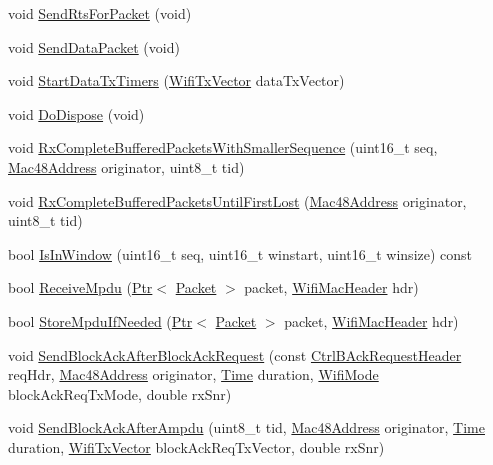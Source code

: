\begin{DoxyCompactItemize}
\item 
void \hyperlink{classns3_1_1MacLow_ac472702b866a51ea2dfb7637381897aa}{Send\+Rts\+For\+Packet} (void)
\item 
void \hyperlink{classns3_1_1MacLow_ab177d7c7ba53c56f91612114412914bf}{Send\+Data\+Packet} (void)
\item 
void \hyperlink{classns3_1_1MacLow_ae7e8072b7d1f8b775000f6f07ee5a3c1}{Start\+Data\+Tx\+Timers} (\hyperlink{classns3_1_1WifiTxVector}{Wifi\+Tx\+Vector} data\+Tx\+Vector)
\item 
void \hyperlink{classns3_1_1MacLow_a5b5f194e54b33b969b9cf8a05728d9fe}{Do\+Dispose} (void)
\item 
void \hyperlink{classns3_1_1MacLow_aaed81a6cbf94baf2b2f17b9f96b8474d}{Rx\+Complete\+Buffered\+Packets\+With\+Smaller\+Sequence} (uint16\+\_\+t seq, \hyperlink{classns3_1_1Mac48Address}{Mac48\+Address} originator, uint8\+\_\+t tid)
\item 
void \hyperlink{classns3_1_1MacLow_aeadf392d37d323fb81f0ef0766f2359a}{Rx\+Complete\+Buffered\+Packets\+Until\+First\+Lost} (\hyperlink{classns3_1_1Mac48Address}{Mac48\+Address} originator, uint8\+\_\+t tid)
\item 
bool \hyperlink{classns3_1_1MacLow_a442078ddeb869fa7e76f35f32e0533c2}{Is\+In\+Window} (uint16\+\_\+t seq, uint16\+\_\+t winstart, uint16\+\_\+t winsize) const 
\item 
bool \hyperlink{classns3_1_1MacLow_a372fe3a76617f1aefa4918f4b1541e88}{Receive\+Mpdu} (\hyperlink{classns3_1_1Ptr}{Ptr}$<$ \hyperlink{classns3_1_1Packet}{Packet} $>$ packet, \hyperlink{classns3_1_1WifiMacHeader}{Wifi\+Mac\+Header} hdr)
\item 
bool \hyperlink{classns3_1_1MacLow_aeada564fc806b1e258a3ef24dd867fdf}{Store\+Mpdu\+If\+Needed} (\hyperlink{classns3_1_1Ptr}{Ptr}$<$ \hyperlink{classns3_1_1Packet}{Packet} $>$ packet, \hyperlink{classns3_1_1WifiMacHeader}{Wifi\+Mac\+Header} hdr)
\item 
void \hyperlink{classns3_1_1MacLow_a84b96c0cc6f32fca28576ec4df6a0853}{Send\+Block\+Ack\+After\+Block\+Ack\+Request} (const \hyperlink{classns3_1_1CtrlBAckRequestHeader}{Ctrl\+B\+Ack\+Request\+Header} req\+Hdr, \hyperlink{classns3_1_1Mac48Address}{Mac48\+Address} originator, \hyperlink{classns3_1_1Time}{Time} duration, \hyperlink{classns3_1_1WifiMode}{Wifi\+Mode} block\+Ack\+Req\+Tx\+Mode, double rx\+Snr)
\item 
void \hyperlink{classns3_1_1MacLow_af6e2acc771d188c0959871f142912296}{Send\+Block\+Ack\+After\+Ampdu} (uint8\+\_\+t tid, \hyperlink{classns3_1_1Mac48Address}{Mac48\+Address} originator, \hyperlink{classns3_1_1Time}{Time} duration, \hyperlink{classns3_1_1WifiTxVector}{Wifi\+Tx\+Vector} block\+Ack\+Req\+Tx\+Vector, double rx\+Snr)

\end{DoxyCompactItemize}
